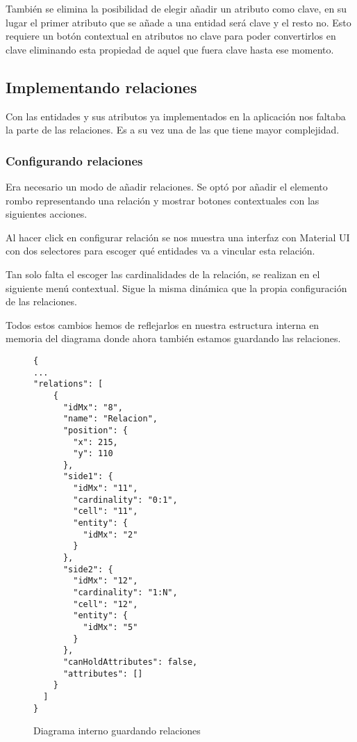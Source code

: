 También se elimina la posibilidad de elegir añadir un atributo como clave, en su lugar el primer atributo que se añade a una entidad será clave y el resto no. Esto requiere un botón contextual en atributos no clave para poder convertirlos en clave eliminando esta propiedad de aquel que fuera clave hasta ese momento.


\subsection{Implementando relaciones}
Con las entidades y sus atributos ya implementados en la aplicación nos faltaba la parte de las relaciones. Es a su vez una de las que tiene mayor complejidad.

\subsubsection{Configurando relaciones}
Era necesario un modo de añadir relaciones. Se optó por añadir el elemento rombo representando una relación y mostrar botones contextuales con las siguientes acciones.


Al hacer click en configurar relación se nos muestra una interfaz con Material UI con dos selectores para escoger qué entidades va a vincular esta relación.


Tan solo falta el escoger las cardinalidades de la relación, se realizan en el siguiente menú contextual. Sigue la misma dinámica que la propia configuración de las relaciones.



Todos estos cambios hemos de reflejarlos en nuestra estructura interna en memoria del diagrama donde ahora también estamos guardando las relaciones.

\begin{figure}
\lstset{breaklines=true, basicstyle=\footnotesize}
\begin{lstlisting}[frame=single]
{
...
"relations": [
    {
      "idMx": "8",
      "name": "Relacion",
      "position": {
        "x": 215,
        "y": 110
      },
      "side1": {
        "idMx": "11",
        "cardinality": "0:1",
        "cell": "11",
        "entity": {
          "idMx": "2"
        }
      },
      "side2": {
        "idMx": "12",
        "cardinality": "1:N",
        "cell": "12",
        "entity": {
          "idMx": "5"
        }
      },
      "canHoldAttributes": false,
      "attributes": []
    }
  ]
}
\end{lstlisting}
\caption{Diagrama interno guardando relaciones}
\end{figure}

